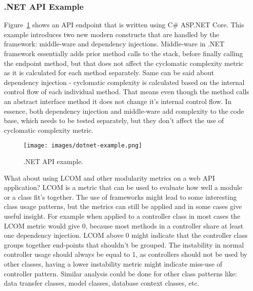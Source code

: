 \documentclass[12pt]{article}
\begin{document}
\subsubsection{.NET API Example}
Figure~\ref{fig:dotnet-example} shows an API endpoint that is written using C\# ASP.NET Core. This example introduces two new modern constructs that are handled by the framework: middle-ware and dependency injections. Middle-ware in .NET framework essentially adds prior method calls to the stack, before finally calling the endpoint method, but that does not affect the cyclomatic complexity metric as it is calculated for each method separately. Same can be said about dependency injection - cyclomatic complexity is calculated based on the internal control flow of each individual method. That means even though the method calls an abstract interface method it does not change it's internal control flow. In essence, both dependency injection and middle-ware add complexity to the code base, which needs to be tested separately, but they don't affect the use of cyclomatic complexity metric.
\begin{figure}[H]
    \centering
    \texttt{[image: images/dotnet-example.png]}
    \caption{.NET API example.}
    \label{fig:dotnet-example}
\end{figure}
What about using LCOM and other modularity metrics on a web API application? LCOM is a metric that can be used to evaluate how well a module or a class fit's together. The use of frameworks might lead to some interesting class usage patterns, but the metrics can still be applied and in some cases give useful insight. For example when applied to a controller class in most cases the LCOM metric would give 0, because most methods in a controller share at least one dependency injection. LCOM above 0 might indicate that the controller class groups together end-points that shouldn't be grouped. The instability in normal controller usage should always be equal to 1, as controllers should not be used by other classes, having a lower instability metric might indicate miss-use of controller pattern. Similar analysis could be done for other class patterns like: data transfer classes, model classes, database context classes, etc. 
\newpage
\end{document}
